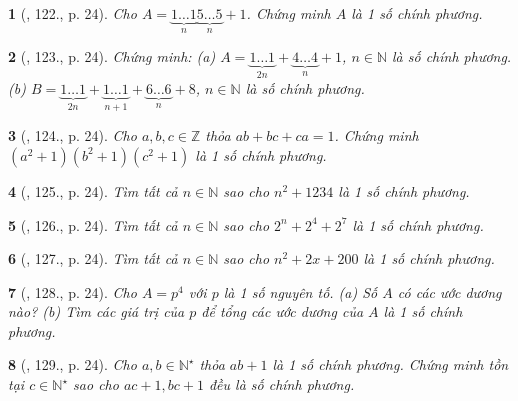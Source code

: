 \documentclass{article}
\newtheorem{baitoan}{}
\begin{document}
\begin{baitoan}[\cite{Tuyen_Toan_8}, 122., p. 24]
	Cho $A = \underbrace{1\ldots1}_n\underbrace{5\ldots5}_n + 1$. Chứng minh $A$ là 1 số chính phương.
\end{baitoan}

\begin{baitoan}[\cite{Tuyen_Toan_8}, 123., p. 24]
	Chứng minh: (a) $A = \underbrace{1\ldots1}_{2n} + \underbrace{4\ldots4}_n + 1$, $n\in\mathbb{N}$ là số chính phương. (b) $B = \underbrace{1\ldots1}_{2n} + \underbrace{1\ldots1}_{n + 1} + \underbrace{6\ldots6}_n + 8$, $n\in\mathbb{N}$ là số chính phương.
\end{baitoan}

\begin{baitoan}[\cite{Tuyen_Toan_8}, 124., p. 24]
	Cho $a,b,c\in\mathbb{Z}$ thỏa $ab + bc + ca = 1$. Chứng minh $(a^2 + 1)(b^2 + 1)(c^2 + 1)$ là 1 số chính phương.
\end{baitoan}

\begin{baitoan}[\cite{Tuyen_Toan_8}, 125., p. 24]
	Tìm tất cả $n\in\mathbb{N}$ sao cho $n^2 + 1234$ là 1 số chính phương.
\end{baitoan}

\begin{baitoan}[\cite{Tuyen_Toan_8}, 126., p. 24]
	Tìm tất cả $n\in\mathbb{N}$ sao cho $2^n + 2^4 + 2^7$ là 1 số chính phương.
\end{baitoan}

\begin{baitoan}[\cite{Tuyen_Toan_8}, 127., p. 24]
	Tìm tất cả $n\in\mathbb{N}$ sao cho $n^2 + 2x + 200$ là 1 số chính phương.
\end{baitoan}

\begin{baitoan}[\cite{Tuyen_Toan_8}, 128., p. 24]
	Cho $A = p^4$ với $p$ là 1 số nguyên tố. (a) Số $A$ có các ước dương nào? (b) Tìm các giá trị của $p$ để tổng các ước dương của $A$ là 1 số chính phương.
\end{baitoan}

\begin{baitoan}[\cite{Tuyen_Toan_8}, 129., p. 24]
	Cho $a,b\in\mathbb{N}^\star$ thỏa $ab + 1$ là 1 số chính phương. Chứng minh tồn tại $c\in\mathbb{N}^\star$ sao cho $ac + 1,bc + 1$ đều là số chính phương.
\end{baitoan}

\end{document}

